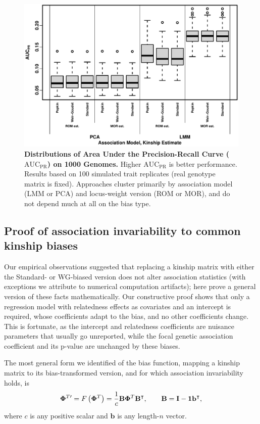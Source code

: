 \documentclass[11pt]{article}
\newcommand{\auc}{\text{AUC}_\text{PR}}
\newcommand{\kinMat}[1][T]{%
  \ensuremath{%
    \mathbf{\Phi}^{#1}
  }%
  \xspace%
}%
\newcommand{\kinMatPrime}{%
  \ensuremath{%
    \mathbf{\Phi}^{T\prime}
  }%
  \xspace%
}%
\begin{document}
\begin{figure}[bp!]
  \centering
  \includegraphics[width=\textwidth]{tgp-nygc-autosomes_ld_prune_1000kb_0.3_maf-0.01/auc.pdf}
  \caption{
    {\bf Distributions of Area Under the Precision-Recall Curve ($\auc$) on 1000 Genomes.}
    Higher $\auc$ is better performance.
    Results based on 100 simulated trait replicates (real genotype matrix is fixed).
    Approaches cluster primarily by association model (LMM or PCA) and locus-weight version (ROM or MOR), and do not depend much at all on the bias type.
  }
  \label{fig:auc_real}
\end{figure}

\subsection{Proof of association invariability to common kinship biases}

Our empirical observations suggested that replacing a kinship matrix with either the Standard- or WG-biased version does not alter association statistics (with exceptions we attribute to numerical computation artifacts); here prove a general version of these facts mathematically.
Our constructive proof shows that only a regression model with relatedness effects as covariates and an intercept is required, whose coefficients adapt to the bias, and no other coefficients change.
This is fortunate, as the intercept and relatedness coefficients are nuisance parameters that usually go unreported, while the focal genetic association coefficient and its p-value are unchanged by these biases.

The most general form we identified of the bias function, mapping a kinship matrix to its bias-transformed version, and for which association invariability holds, is
\begin{equation}
  \label{eq:kin-bias-general}
  \kinMatPrime
  =
  F \left( \kinMat \right)
  =
  \frac{1}{c}
  \mathbf{B} \kinMat \mathbf{B}^\intercal
  , \quad\quad
  \mathbf{B}
  =
  \mathbf{I} - \mathbf{1} \mathbf{b}^\intercal
  ,
\end{equation}
where $c$ is any positive scalar and $\mathbf{b}$ is any length-$n$ vector.
\end{document}
